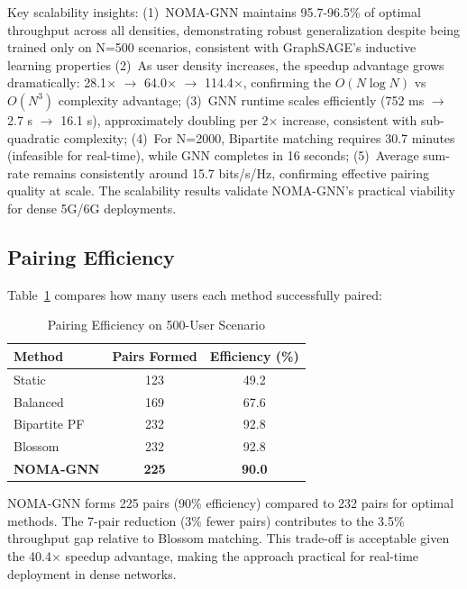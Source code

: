 \documentclass[conference]{IEEEtran}
\begin{document}
Key scalability insights: (1)~NOMA-GNN maintains 95.7-96.5\% of optimal throughput across all densities, demonstrating robust generalization despite being trained only on N=500 scenarios, consistent with GraphSAGE's inductive learning properties  (2)~As user density increases, the speedup advantage grows dramatically: 28.1$\times$ $\rightarrow$ 64.0$\times$ $\rightarrow$ 114.4$\times$, confirming the $O(N \log N)$ vs $O(N^3)$ complexity advantage; (3)~GNN runtime scales efficiently (752 ms $\rightarrow$ 2.7 s $\rightarrow$ 16.1 s), approximately doubling per 2$\times$ increase, consistent with sub-quadratic complexity; (4)~For N=2000, Bipartite matching \cite{mishra2022connection} requires 30.7 minutes (infeasible for real-time), while GNN completes in 16 seconds; (5)~Average sum-rate remains consistently around 15.7 bits/s/Hz, confirming effective pairing quality at scale. The scalability results validate NOMA-GNN's practical viability for dense 5G/6G deployments.

\subsection{Pairing Efficiency}

Table~\ref{tab:pairing_efficiency} compares how many users each method successfully paired:

\begin{table}[h]
\centering
\caption{Pairing Efficiency on 500-User Scenario}
\label{tab:pairing_efficiency}
\begin{tabular}{lcc}
\toprule
\textbf{Method} & \textbf{Pairs Formed} & \textbf{Efficiency (\%)} \\
\midrule
Static & 123 & 49.2 \\
Balanced & 169 & 67.6 \\
Bipartite PF & 232 & 92.8 \\
Blossom & 232 & 92.8 \\
\textbf{NOMA-GNN} & \textbf{225} & \textbf{90.0} \\
\bottomrule
\end{tabular}
\end{table}

NOMA-GNN forms 225 pairs (90\% efficiency) compared to 232 pairs for optimal methods. The 7-pair reduction (3\% fewer pairs) contributes to the 3.5\% throughput gap relative to Blossom matching. This trade-off is acceptable given the 40.4$\times$ speedup advantage, making the approach practical for real-time deployment in dense networks.
\end{document}

